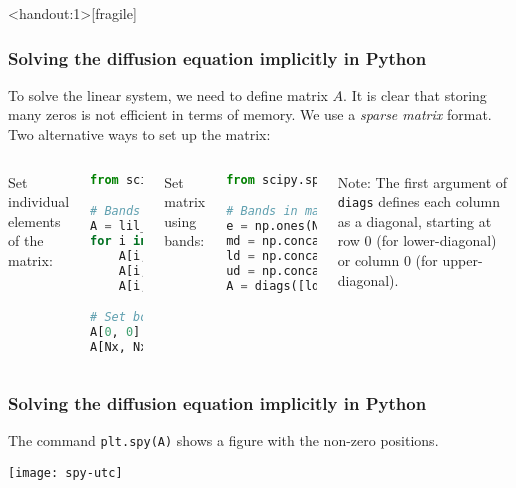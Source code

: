 \begin{frame}<handout:1>[fragile]
  \frametitle{Solving the diffusion equation implicitly in Python}
  To solve the linear system, we need to define matrix $A$. It is clear that storing many zeros is not efficient in terms of memory. We use a \emph{sparse matrix} format. Two alternative ways to set up the matrix:\\
  
  \begin{columns}[t]
  Set individual elements of the matrix:
  \begin{lstlisting}[language=Python,basicstyle=\scriptsize]
from scipy.sparse import lil_matrix

# Bands in matrix (internal cells)
A = lil_matrix((Nx+1, Nx+1))
for i in range(1, Nx):
    A[i, i-1] = -Fo
    A[i, i]   = 1 + 2*Fo
    A[i, i+1] = -Fo

# Set boundary cells, only main diag:
A[0, 0] = 1       # Left
A[Nx, Nx] = 1     # Right
  \end{lstlisting}
  Set matrix using bands:
    \begin{lstlisting}[language=Python,basicstyle=\scriptsize\ttfamily]
from scipy.sparse import diags

# Bands in matrix (internal cells)
e = np.ones(Nx-1) # Ones for internal cells
md = np.concatenate(([1], e * (1 + 2*Fo), [1])) # Main diagonal
ld = np.concatenate((-e * Fo, [0])) # Lower diagonal
ud = np.concatenate(([0], -e * Fo)) # Upper diagonal
A = diags([ld, md, ud], offsets=[-1, 0, 1])
  \end{lstlisting}
  Note: The first argument of \lstinline|diags| defines each column as a diagonal, starting at row 0 (for lower-diagonal) or column 0 (for upper-diagonal).
  \end{columns}
\end{frame}


\begin{frame}[fragile]
  \frametitle{Solving the diffusion equation implicitly in Python}
  The command \lstinline|plt.spy(A)| shows a figure with the non-zero positions.
  \begin{center}
    \texttt{[image: spy-utc]}
  \end{center}
\end{frame}


